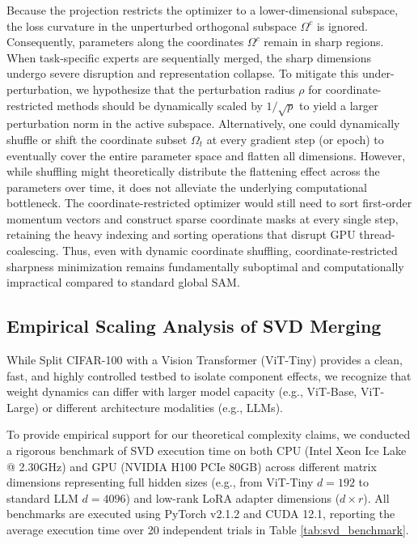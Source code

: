\documentclass{article}
\theoremstyle{plain}
\theoremstyle{definition}
\theoremstyle{remark}
\begin{document}
Because the projection restricts the optimizer to a lower-dimensional subspace, the loss curvature in the unperturbed orthogonal subspace $\Omega^c$ is ignored. Consequently, parameters along the coordinates $\Omega^c$ remain in sharp regions. When task-specific experts are sequentially merged, the sharp dimensions undergo severe disruption and representation collapse. To mitigate this under-perturbation, we hypothesize that the perturbation radius $\rho$ for coordinate-restricted methods should be dynamically scaled by $1/\sqrt{p}$ to yield a larger perturbation norm in the active subspace. Alternatively, one could dynamically shuffle or shift the coordinate subset $\Omega_t$ at every gradient step (or epoch) to eventually cover the entire parameter space and flatten all dimensions. However, while shuffling might theoretically distribute the flattening effect across the parameters over time, it does not alleviate the underlying computational bottleneck. The coordinate-restricted optimizer would still need to sort first-order momentum vectors and construct sparse coordinate masks at every single step, retaining the heavy indexing and sorting operations that disrupt GPU thread-coalescing. Thus, even with dynamic coordinate shuffling, coordinate-restricted sharpness minimization remains fundamentally suboptimal and computationally impractical compared to standard global SAM.

\subsection{Empirical Scaling Analysis of SVD Merging}
\label{sec:appendix_svd}
While Split CIFAR-100 with a Vision Transformer (ViT-Tiny) provides a clean, fast, and highly controlled testbed to isolate component effects, we recognize that weight dynamics can differ with larger model capacity (e.g., ViT-Base, ViT-Large) or different architecture modalities (e.g., LLMs).

To provide empirical support for our theoretical complexity claims, we conducted a rigorous benchmark of SVD execution time on both CPU (Intel Xeon Ice Lake @ 2.30GHz) and GPU (NVIDIA H100 PCIe 80GB) across different matrix dimensions representing full hidden sizes (e.g., from ViT-Tiny $d=192$ to standard LLM $d=4096$) and low-rank LoRA adapter dimensions ($d \times r$). All benchmarks are executed using PyTorch v2.1.2 and CUDA 12.1, reporting the average execution time over 20 independent trials in Table \ref{tab:svd_benchmark}.
\end{document}
